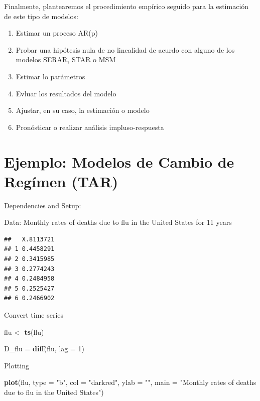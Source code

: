 \documentclass[
]{book}
\newenvironment{Shaded}{\begin{snugshade}}{\end{snugshade}}
\newcommand{\AttributeTok}[1]{\textcolor[rgb]{0.13,0.29,0.53}{#1}}
\newcommand{\DecValTok}[1]{\textcolor[rgb]{0.00,0.00,0.81}{#1}}
\newcommand{\FunctionTok}[1]{\textcolor[rgb]{0.13,0.29,0.53}{\textbf{#1}}}
\newcommand{\NormalTok}[1]{#1}
\newcommand{\OtherTok}[1]{\textcolor[rgb]{0.56,0.35,0.01}{#1}}
\newcommand{\StringTok}[1]{\textcolor[rgb]{0.31,0.60,0.02}{#1}}
\begin{document}
Finalmente, plantearemos el procedimiento empírico seguido para la estimación de este tipo de modelos:

\begin{enumerate}
    \item Estimar un proceso AR(p)
    
    \item Probar una hipótesis nula de no linealidad de acurdo con alguno de los modelos SERAR, STAR o MSM
    
    \item Estimar lo parámetros
    
    \item Evluar los resultados del modelo
    
    \item Ajustar, en su caso, la estimación o modelo
    
    \item Pronósticar o realizar análisis impluso-respuesta
\end{enumerate}

\hypertarget{ejemplo-modelos-de-cambio-de-reguxedmen-tar}{%
\section{Ejemplo: Modelos de Cambio de Regímen (TAR)}\label{ejemplo-modelos-de-cambio-de-reguxedmen-tar}}

Dependencies and Setup:

Data: Monthly rates of deaths due to flu in the United States for 11 years

\begin{verbatim}
##   X.8113721
## 1 0.4458291
## 2 0.3415985
## 3 0.2774243
## 4 0.2484958
## 5 0.2525427
## 6 0.2466902
\end{verbatim}

Convert time series

\begin{Shaded}
\begin{Highlighting}[]
\NormalTok{flu }\OtherTok{\textless{}{-}} \FunctionTok{ts}\NormalTok{(flu)}

\NormalTok{D\_flu }\OtherTok{=} \FunctionTok{diff}\NormalTok{(flu, }\AttributeTok{lag =} \DecValTok{1}\NormalTok{)}
\end{Highlighting}
\end{Shaded}

Plotting

\begin{Shaded}
\begin{Highlighting}[]
\FunctionTok{plot}\NormalTok{(flu, }\AttributeTok{type =} \StringTok{"b"}\NormalTok{, }\AttributeTok{col =} \StringTok{"darkred"}\NormalTok{, }\AttributeTok{ylab =} \StringTok{""}\NormalTok{, }
     \AttributeTok{main =} \StringTok{"Monthly rates of deaths due to flu in the United States"}\NormalTok{)}
\end{Highlighting}
\end{Shaded}
\end{document}
